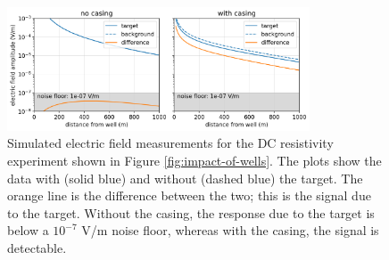 \begin{figure}[!htb]
    \begin{center}
    \includegraphics[width=0.8\textwidth]{figures/impact-of-wells-data.png}
    \end{center}
\caption{
    Simulated electric field measurements for the DC resistivity experiment shown in Figure \ref{fig:impact-of-wells}.
    The plots show the data with (solid blue) and without (dashed blue) the target. The orange line is the difference between the two; this is the signal due to the target.
    Without the casing, the response due to the target is below a $10^{-7}$ V/m noise floor, whereas with the casing, the signal is detectable.
}
\label{fig:impact-of-wells-data}
\end{figure}
